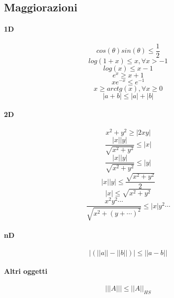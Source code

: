 \documentclass[a4paper,12pt]{article}
\begin{document}
\subsection{Maggiorazioni}
\paragraph{1D}
$$cos(\theta)sin(\theta) \leq \frac{1}{2}$$
$$ log(1+x) \leq x, \forall x > -1$$
$$ log(x) \leq x-1 $$
$$ e^x \geq x+1 $$
$$xe^{-x} \leq e^{-1}$$
$$x \geq arctg(x), \forall x \geq 0$$
$$|a+b|\leq |a|+|b|$$
\paragraph{2D}
$$x^2+y^2\geq |2xy|$$
$$\dfrac{|x||y|}{\sqrt{x^2+y^2}} \leq |x|$$
$$\dfrac{|x||y|}{\sqrt{x^2+y^2}} \leq |y|$$
$$|x||y| \leq \dfrac{\sqrt{x^2+y^2}}{2}$$
$$|x| \leq \sqrt{x^2+y^2} $$
$$\dfrac{x^2y^2\cdots}{\sqrt{x^2+(y+\cdots)^2}} \leq |x|y^2\cdots $$
\paragraph{nD}
$$|(||a||-||b||)|\leq||a-b||$$
\paragraph{Altri oggetti}
$$|||A||| \leq ||A||_{HS}$$
\end{document}
